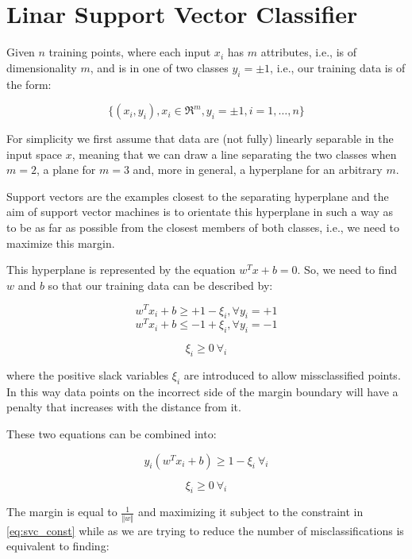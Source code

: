 \section{Linar Support Vector Classifier}

Given $n$ training points, where each input $x_i$ has $m$ attributes, i.e., is of dimensionality $m$, and is in one of two classes $y_i=\pm1$, i.e., our training data is of the form:

\begin{equation}
	\{(x_i,y_i), x_i\in\Re^{m}, y_i=\pm1, i=1, \dots, n\} \label{eq:svc_data}
\end{equation}

For simplicity we first assume that data are (not fully) linearly separable in the input space $x$, meaning that we can draw a line separating the two classes when $m=2$, a plane for $m=3$ and, more in general, a hyperplane for an arbitrary $m$.

Support vectors are the examples closest to the separating hyperplane and the aim of support vector machines is to orientate this hyperplane in such a way as to be as far as possible from the closest members of both classes, i.e., we need to maximize this margin.

This hyperplane is represented by the equation $w^T x + b=0$. So, we need to find $w$ and $b$ so that our training data can be described by:

\begin{equation}
    w^T x_i + b\geq+1-\xi_i, \forall y_i=+1 \label{eq:svc_const1}
\end{equation}
\begin{equation}
    w^T x_i + b\leq-1+\xi_i, \forall y_i=-1 \label{eq:svc_const2}
\end{equation}

$$\xi_i\geq 0 \ \forall_i$$

where the positive slack variables $\xi_i$ are introduced to allow missclassified points. In this way data points on the incorrect side of the margin boundary will have a penalty that increases with the distance from it.

These two equations can be combined into:

\begin{equation}
    y_i (w^T x_i + b) \geq 1 - \xi_i \ \forall_i \label{eq:svc_const}
\end{equation}

$$\xi_i\geq 0 \ \forall_i$$

The margin is equal to $\displaystyle \frac{1}{\Vert w\Vert}$ and maximizing it subject to the constraint in \ref{eq:svc_const} while as we are trying to reduce the number of misclassifications is equivalent to finding:

